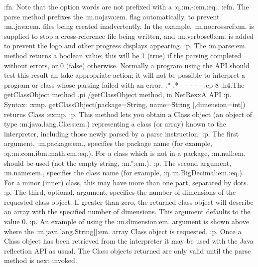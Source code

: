 :fn.
Note that the option words are not prefixed with a :q.:m.-:em.:eq..
:efn.
The parse method prefixes the :m.nojava:em. flag automatically, to
prevent :m..java:em. files being created inadvertently.  In the
example, :m.nocrossref:em. is supplied to stop a cross-reference file
being written, and :m.verbose0:em. is added to prevent the logo and
other progress displays appearing.
:p.
The :m.parse:em. method returns a boolean value; this will be 1 (true)
if the parsing completed without errors, or 0 (false) otherwise.
Normally a program using the API should test this result an take
appropriate action; it will not be possible to interpret a program or
class whose parsing failed with an error.
.*
.* - - - - -
.cp 8
:h4.The getClassObject method
.pi /getClassObject method, in NetRexxA API
:p.
Syntax:
:xmp.
getClassObject(package=String, name=String [,dimension=int]) returns Class
:exmp.
:p.
This method lets you obtain a Class object (an object of
type :m.java.lang.Class:em.)  representing a class (or array) known to
the interpreter, including those newly parsed by a parse instruction.
:p.
The first argument, :m.package:em., specifies the package name (for
example, :q.:m.com.ibm.math:em.:eq.).  For a class which is not in a
package, :m.null:em. should be used (not the empty string, :m.'':em.).
:p.
The second argument, :m.name:em., specifies the class name (for example,
:q.:m.BigDecimal:em.:eq.).  For a minor (inner) class, this may have
more than one part, separated by dots.
:p.
The third, optional, argument, specifies the number of dimensions of
the requested class object.  If greater than zero, the returned class
object will describe an array with the specified number of dimensions.
This argument defaults to the value 0.
:p.
An example of using the :m.dimension:em. argument is shown above where
the :m.java.lang.String[]:em. array Class object is requested.
:p.
Once a Class object has been retrieved from the interpreter it may be
used with the Java reflection API as usual.  The Class objects returned
are only valid until the parse method is next invoked.
